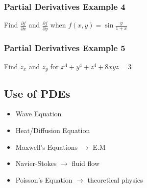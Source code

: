 \documentclass[12pt]{article}
\begin{document}
\subsubsection{Partial Derivatives Example 4}
Find \(\frac{\partial f}{\partial x} \) and \(\frac{\partial f}{\partial y} \) when \(f(x,y) = \sin \frac{y}{1+x}\) 

\subsubsection{Partial Derivatives Example 5}
Find \(z_x\) and \(z_y\) for \(x^4 + y^4 + z^4 + 8xyz = 3\) 

\subsection{Use of PDEs}
\begin{itemize}
	\item Wave Equation
	\item Heat/Diffusion Equation
	\item Maxwell's Equations \(\rightarrow \) E.M
	\item Navier-Stokes \(\rightarrow \) fluid flow
	\item Poisson's Equation \(\rightarrow \) theoretical physics
\end{itemize}
\end{document}
